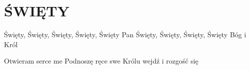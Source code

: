 \documentclass[../../../songbook.tex]{subfiles}
\begin{document}
\TabPositions{8cm} %
\section*{ŚWIĘTY}
{}
\vspace{0.5cm}
Święty, Święty, Święty, Święty, Święty Pan	 \newline
Święty, Święty, Święty, Święty Bóg i Król	 \newline	

Otwieram serce me			 \newline	
Podnoszę ręce swe			 \newline	
Królu wejdź i rozgość się	 \newline	
\end{document}
